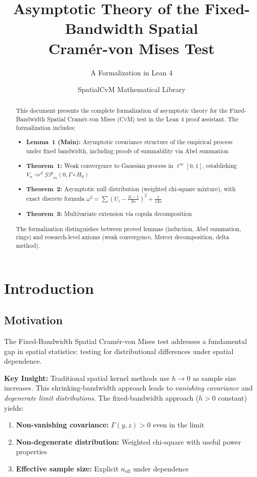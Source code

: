 \documentclass[11pt,a4paper]{amsart}
\title{Asymptotic Theory of the Fixed-Bandwidth Spatial\\
Cram\'{e}r-von Mises Test}
\subtitle{A Formalization in Lean 4}
\author{SpatialCvM Mathematical Library}
\theoremstyle{definition}
\newcommand{\aslim}{\Rightarrow^d}
\newcommand{\GP}{\mathcal{GP}}
\begin{document}
\maketitle

\begin{abstract}
This document presents the complete formalization of asymptotic theory for 
the Fixed-Bandwidth Spatial Cram\'{e}r-von Mises (CvM) test in the Lean 4 
proof assistant. The formalization includes:
\begin{itemize}
\item \textbf{Lemma~1 (Main):} Asymptotic covariance structure of the empirical 
process under fixed bandwidth, including proofs of summability via Abel summation
\item \textbf{Theorem~1:} Weak convergence to Gaussian process in $\ell^\infty[0,1]$,
establishing $V_n \aslim \GP_m(0, \Gamma\circ H_0)$
\item \textbf{Theorem~2:} Asymptotic null distribution (weighted chi-square mixture),
with exact discrete formula $\omega^2 = \sum(U_i - \frac{2i-1}{2n})^2 + \frac{1}{12n}$
\item \textbf{Theorem~3:} Multivariate extension via copula decomposition
\end{itemize}
The formalization distinguishes between proved lemmas (induction, Abel summation,
rings) and research-level axioms (weak convergence, Mercer decomposition, delta method).
\end{abstract}

\tableofcontents

\section{Introduction}
\label{sec:intro}

\subsection{Motivation}

The Fixed-Bandwidth Spatial Cram\'{e}r-von Mises test addresses a fundamental gap 
in spatial statistics: testing for distributional differences under spatial dependence.

\textbf{Key Insight:} Traditional spatial kernel methods use $h \to 0$ as sample 
size increases. This shrinking-bandwidth approach leads to \emph{vanishing covariance} 
and \emph{degenerate limit distributions}. The fixed-bandwidth approach ($h > 0$ constant) 
yields:
\begin{enumerate}
\item \textbf{Non-vanishing covariance:} $\Gamma(y,z) > 0$ even in the limit
\item \textbf{Non-degenerate distribution:} Weighted chi-square with useful power properties
\item \textbf{Effective sample size:} Explicit $n_{\text{eff}}$ under dependence
\end{enumerate}
\end{document}
